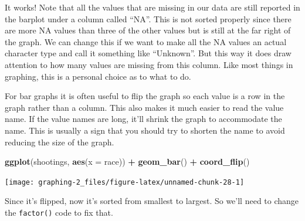 \documentclass[
  12pt,
]{book}
\newenvironment{Shaded}{\begin{snugshade}}{\end{snugshade}}
\newcommand{\DataTypeTok}[1]{\textcolor[rgb]{0.13,0.29,0.53}{#1}}
\newcommand{\KeywordTok}[1]{\textcolor[rgb]{0.13,0.29,0.53}{\textbf{#1}}}
\newcommand{\NormalTok}[1]{#1}
\newcommand{\OperatorTok}[1]{\textcolor[rgb]{0.81,0.36,0.00}{\textbf{#1}}}
\newcommand{\OtherTok}[1]{\textcolor[rgb]{0.56,0.35,0.01}{#1}}
\newcommand{\StringTok}[1]{\textcolor[rgb]{0.31,0.60,0.02}{#1}}
\begin{document}
It works! Note that all the values that are missing in our data are still reported in the barplot under a column called ``NA''. This is not sorted properly since there are more NA values than three of the other values but is still at the far right of the graph. We can change this if we want to make all the NA values an actual character type and call it something like ``Unknown''. But this way it does draw attention to how many values are missing from this column. Like most things in graphing, this is a personal choice as to what to do.

For bar graphs it is often useful to flip the graph so each value is a row in the graph rather than a column. This also makes it much easier to read the value name. If the value names are long, it'll shrink the graph to accommodate the name. This is usually a sign that you should try to shorten the name to avoid reducing the size of the graph.

\begin{Shaded}
\begin{Highlighting}[]
\KeywordTok{ggplot}\NormalTok{(shootings, }\KeywordTok{aes}\NormalTok{(}\DataTypeTok{x =}\NormalTok{ race)) }\OperatorTok{+}\StringTok{ }
\StringTok{  }\KeywordTok{geom\_bar}\NormalTok{() }\OperatorTok{+}
\StringTok{  }\KeywordTok{coord\_flip}\NormalTok{() }
\end{Highlighting}
\end{Shaded}

\begin{center}\texttt{[image: graphing-2\_files/figure-latex/unnamed-chunk-28-1]} \end{center}

Since it's flipped, now it's sorted from smallest to largest. So we'll need to change the \texttt{factor()} code to fix that.

\begin{Shaded}
\end{Shaded}
\end{document}

